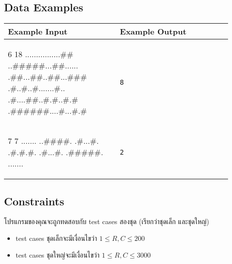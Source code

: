 \newpage
\subsection*{\sectionfont\upshape Data Examples}
\begin{tabular}{p{0.45\linewidth}p{0.45\linewidth}}
\toprule
Example Input & Example Output \\
\midrule
\begin{centervrb}{18}
\begin{plainvrb}
6 18
................##
..#####...##......
.##...##..##...###
.#..#..#.......#..
.#....##..#.#..#.#
.######....#...#.#

\end{plainvrb} 
\end{centervrb} &
\verb|8| \\
\midrule
\begin{centervrb}{7}
\setstretch{0.8}
\begin{plainvrb}
7 7
.......
..####.
.#...#.
.#.#.#.
.#...#.
.#####.
.......

\end{plainvrb} 
\end{centervrb} &
\verb|2| \\
\bottomrule
\end{tabular}

\subsection*{\sectionfont\upshape Constraints}

โปรแกรมของคุณจะถูกทดสอบกับ test cases สองชุด (เรียกว่าชุดเล็ก และชุดใหญ่)
\begin{itemize}
\item test cases ชุดเล็กจะมีเงื่อนไขว่า ${1} \leq R, C \leq {200}$
\item test cases ชุดใหญ่จะมีเงื่อนไขว่า ${1} \leq R, C \leq {3000}$
\end{itemize}
